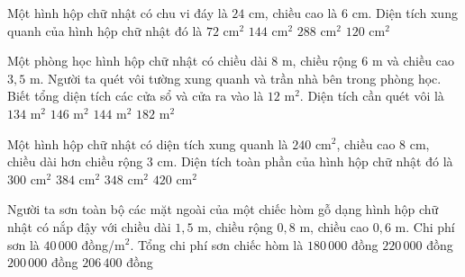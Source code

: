 \begin{ex} %
Một hình hộp chữ nhật có chu vi đáy là $24\text{ cm}$, chiều cao là $6\text{ cm}$. Diện tích xung quanh của hình hộp chữ nhật đó là
\choice
{$72\text{ cm}^2$}
{\True $144\text{ cm}^2$}
{$288\text{ cm}^2$}
{$120\text{ cm}^2$}
\end{ex}

\begin{ex} %
Một phòng học hình hộp chữ nhật có chiều dài $8\text{ m}$, chiều rộng $6\text{ m}$ và chiều cao $3{,}5\text{ m}$. Người ta quét vôi tường xung quanh và trần nhà bên trong phòng học. Biết tổng diện tích các cửa sổ và cửa ra vào là $12\text{ m}^2$. Diện tích cần quét vôi là
\choice
{\True $134\text{ m}^2$}
{$146\text{ m}^2$}
{$144\text{ m}^2$}
{$182\text{ m}^2$}
\end{ex}

\begin{ex} %
Một hình hộp chữ nhật có diện tích xung quanh là $240\text{ cm}^2$, chiều cao $8\text{ cm}$, chiều dài hơn chiều rộng $3\text{ cm}$. Diện tích toàn phần của hình hộp chữ nhật đó là
\choice
{$300\text{ cm}^2$}
{$384\text{ cm}^2$}
{\True $348\text{ cm}^2$}
{$420\text{ cm}^2$}
\end{ex}

\begin{ex} %
Người ta sơn toàn bộ các mặt ngoài của một chiếc hòm gỗ dạng hình hộp chữ nhật có nắp đậy với chiều dài $1{,}5\text{ m}$, chiều rộng $0{,}8\text{ m}$, chiều cao $0{,}6\text{ m}$. Chi phí sơn là $40\,000$ đồng/$\text{m}^2$. Tổng chi phí sơn chiếc hòm là
\choice
{$180\,000$ đồng}
{$220\,000$ đồng}
{$200\,000$ đồng}
{\True $206\,400$ đồng}
\end{ex}

